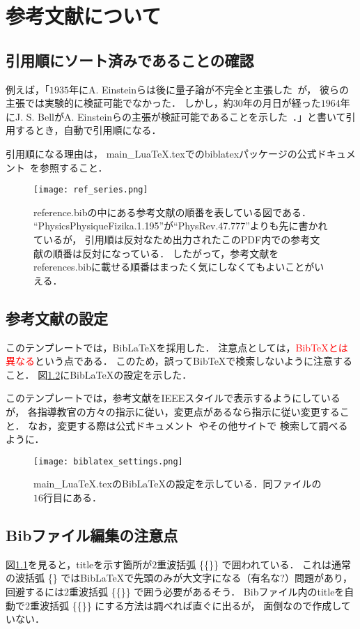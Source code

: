 \chapter{参考文献について}
\section{引用順にソート済みであることの確認}
例えば，「$1935$年にA. Einsteinらは後に量子論が不完全と主張した~\cite{PhysRev.47.777}が，
彼らの主張では実験的に検証可能でなかった．
しかし，約$30$年の月日が経った$1964$年にJ. S. BellがA. Einsteinらの主張が検証可能であることを示した~\cite{PhysicsPhysiqueFizika.1.195}．」と書いて引用するとき，自動で引用順になる．

引用順になる理由は，
main\_LuaTeX.texでのbiblatexパッケージの公式ドキュメント~\cite{biblatex}を参照すること．

\begin{figure}[h]
  \centering
  \texttt{[image: ref\_series.png]}
  \caption{reference.bibの中にある参考文献の順番を表している図である．
  ``PhysicsPhysiqueFizika.1.195''が``PhysRev.47.777''よりも先に書かれているが，
  引用順は反対なため出力されたこのPDF内での参考文献の順番は反対になっている．
  したがって，参考文献をreferences.bibに載せる順番はまったく気にしなくてもよいことがいえる．}
  \label{fig:ref_series}
\end{figure}

\section{参考文献の設定}
このテンプレートでは，Bib\LaTeX を採用した．
注意点としては，\textcolor{red}{Bib\TeX とは異なる}という点である．
このため，誤ってBib\TeX で検索しないように注意すること．
図\ref{fig:biblatex_settings}にBib\LaTeX の設定を示した．

このテンプレートでは，参考文献をIEEEスタイルで表示するようにしているが，
各指導教官の方々の指示に従い，変更点があるなら指示に従い変更すること．
なお，変更する際は公式ドキュメント~\cite{biblatex}やその他サイトで
検索して調べるように．

\begin{figure}[h]
  \centering
  \texttt{[image: biblatex\_settings.png]}
  \caption{main\_LuaTeX.texのBib\LaTeX の設定を示している．同ファイルの$16$行目にある．}
  \label{fig:biblatex_settings}
\end{figure}

\section{Bibファイル編集の注意点}
図\ref{fig:ref_series}を見ると，titleを示す箇所が$2$重波括弧 \{\{\}\} で囲われている．
これは通常の波括弧 \{\} ではBib\LaTeX で先頭のみが大文字になる（有名な?）問題があり，
回避するには$2$重波括弧 \{\{\}\} で囲う必要があるそう．
Bibファイル内のtitleを自動で$2$重波括弧 \{\{\}\} にする方法は調べれば直ぐに出るが，
面倒なので作成していない．
